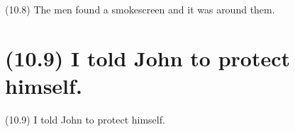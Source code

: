 \documentclass{article}
\begin{document}
\bigbreak
\begin{enumerate*}
\item[(10.8)] The men found a smokescreen and it was around them.
\end{enumerate*}
\bigbreak

\bigbreak
\begin{minipage}{\textwidth}
\end{minipage}
\bigbreak

\clearpage

%
%

\section*{(10.9) I told John to protect himself.}

\bigbreak
\begin{enumerate*}
\item[(10.9)] I told John to protect himself.
\end{enumerate*}
\bigbreak

\bigbreak
\begin{minipage}{\textwidth}
\end{minipage}
\bigbreak

\clearpage

%
%
\end{document}

